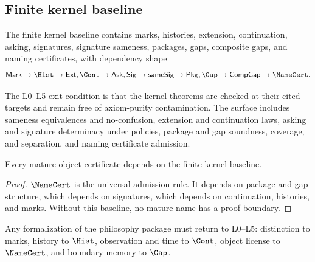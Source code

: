 \subsection{Finite kernel baseline}
\label{subsec:philosophy-programme-kernel-baseline}

\begin{definition}
\label{def:philosophy-programme-finite-kernel-baseline}
The finite kernel baseline contains marks, histories, extension,
continuation, asking, signatures, signature sameness, packages, gaps,
composite gaps, and naming certificates, with dependency shape
$$
\mathsf{Mark}
\to \Hist
\to \mathsf{Ext},\Cont
\to \mathsf{Ask},\mathsf{Sig}
\to \mathsf{sameSig}
\to \mathsf{Pkg},\Gap
\to \mathsf{CompGap}
\to \NameCert.
$$
\end{definition}

\begin{definition}
\label{def:philosophy-programme-kernel-exit-condition}
The L0--L5 exit condition is that the kernel theorems are checked at
their cited targets and remain free of axiom-purity contamination. The
surface includes sameness equivalences and no-confusion, extension and
continuation laws, asking and signature determinacy under policies,
package and gap soundness, coverage, and separation, and naming
certificate admission.
\end{definition}

\begin{theorem}
\label{thm:philosophy-programme-kernel-precedes-mature}
Every mature-object certificate depends on the finite kernel baseline.
\end{theorem}
\begin{proof}
\(\NameCert\) is the universal admission rule. It depends on package
and gap structure, which depends on signatures, which depends on
continuation, histories, and marks. Without this baseline, no mature
name has a proof boundary.
\end{proof}


\begin{corollary}
\label{cor:philosophy-programme-philosophy-depends-kernel}
Any formalization of the philosophy package must return to L0--L5:
distinction to marks, history to \(\Hist\), observation and time to
\(\Cont\), object license to \(\NameCert\), and boundary memory to
\(\Gap\).
\end{corollary}

